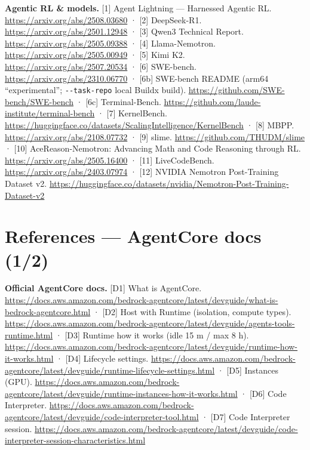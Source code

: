 \documentclass[
  paper=a4,
  ,captions=tableheading
]{scrartcl}
\begin{document}
\textbf{Agentic RL \& models.} {[}1{]} Agent Lightning --- Harnessed
Agentic RL. \url{https://arxiv.org/abs/2508.03680} · {[}2{]}
DeepSeek-R1. \url{https://arxiv.org/abs/2501.12948} · {[}3{]} Qwen3
Technical Report. \url{https://arxiv.org/abs/2505.09388} · {[}4{]}
Llama-Nemotron. \url{https://arxiv.org/abs/2505.00949} · {[}5{]} Kimi
K2. \url{https://arxiv.org/abs/2507.20534} · {[}6{]} SWE-bench.
\url{https://arxiv.org/abs/2310.06770} · {[}6b{]} SWE-bench README
(arm64 ``experimental''; \texttt{-\/-task-repo} local Buildx build).
\url{https://github.com/SWE-bench/SWE-bench} · {[}6c{]} Terminal-Bench.
\url{https://github.com/laude-institute/terminal-bench} · {[}7{]}
KernelBench.
\url{https://huggingface.co/datasets/ScalingIntelligence/KernelBench} ·
{[}8{]} MBPP. \url{https://arxiv.org/abs/2108.07732} · {[}9{]} slime.
\url{https://github.com/THUDM/slime} · {[}10{]} AceReason-Nemotron:
Advancing Math and Code Reasoning through RL.
\url{https://arxiv.org/abs/2505.16400} · {[}11{]} LiveCodeBench.
\url{https://arxiv.org/abs/2403.07974} · {[}12{]} NVIDIA Nemotron
Post-Training Dataset v2.
\url{https://huggingface.co/datasets/nvidia/Nemotron-Post-Training-Dataset-v2}

\hypertarget{references-agentcore-docs-12}{%
\section{References --- AgentCore docs
(1/2)}\label{references-agentcore-docs-12}}

\scriptsize

\textbf{Official AgentCore docs.} {[}D1{]} What is AgentCore.
\url{https://docs.aws.amazon.com/bedrock-agentcore/latest/devguide/what-is-bedrock-agentcore.html}
· {[}D2{]} Host with Runtime (isolation, compute types).
\url{https://docs.aws.amazon.com/bedrock-agentcore/latest/devguide/agents-tools-runtime.html}
· {[}D3{]} Runtime how it works (idle 15 m / max 8 h).
\url{https://docs.aws.amazon.com/bedrock-agentcore/latest/devguide/runtime-how-it-works.html}
· {[}D4{]} Lifecycle settings.
\url{https://docs.aws.amazon.com/bedrock-agentcore/latest/devguide/runtime-lifecycle-settings.html}
· {[}D5{]} Instances (GPU).
\url{https://docs.aws.amazon.com/bedrock-agentcore/latest/devguide/runtime-instances-how-it-works.html}
· {[}D6{]} Code Interpreter.
\url{https://docs.aws.amazon.com/bedrock-agentcore/latest/devguide/code-interpreter-tool.html}
· {[}D7{]} Code Interpreter session.
\url{https://docs.aws.amazon.com/bedrock-agentcore/latest/devguide/code-interpreter-session-characteristics.html}
\end{document}

